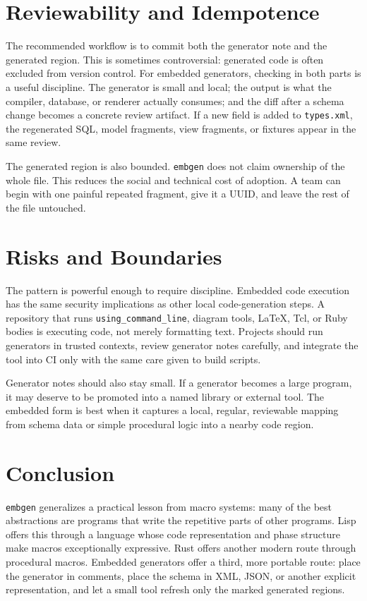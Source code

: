 \documentclass[11pt]{article}
\begin{document}
\section{Reviewability and Idempotence}

The recommended workflow is to commit both the generator note and the generated
region.  This is sometimes controversial: generated code is often excluded from
version control.  For embedded generators, checking in both parts is a useful
discipline.  The generator is small and local; the output is what the compiler,
database, or renderer actually consumes; and the diff after a schema change
becomes a concrete review artifact.  If a new field is added to
\texttt{types.xml}, the regenerated SQL, model fragments, view fragments, or
fixtures appear in the same review.

The generated region is also bounded.  \texttt{embgen} does not claim ownership
of the whole file.  This reduces the social and technical cost of adoption.  A
team can begin with one painful repeated fragment, give it a UUID, and leave the
rest of the file untouched.

\section{Risks and Boundaries}

The pattern is powerful enough to require discipline.  Embedded code execution
has the same security implications as other local code-generation steps.  A
repository that runs \texttt{using\_command\_line}, diagram tools, LaTeX, Tcl, or
Ruby bodies is executing code, not merely formatting text.  Projects should run
generators in trusted contexts, review generator notes carefully, and integrate
the tool into CI only with the same care given to build scripts.

Generator notes should also stay small.  If a generator becomes a large program,
it may deserve to be promoted into a named library or external tool.  The
embedded form is best when it captures a local, regular, reviewable mapping
from schema data or simple procedural logic into a nearby code region.

\section{Conclusion}

\texttt{embgen} generalizes a practical lesson from macro systems: many of the
best abstractions are programs that write the repetitive parts of other
programs.  Lisp offers this through a language whose code representation and
phase structure make macros exceptionally expressive.  Rust offers another
modern route through procedural macros.  Embedded generators offer a third,
more portable route: place the generator in comments, place the schema in XML,
JSON, or another explicit representation, and let a small tool refresh only the
marked generated regions.
\end{document}

